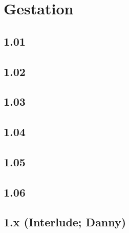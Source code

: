 \part{Gestation}
\chapter{1.01}


\chapter{1.02}


\chapter{1.03}


\chapter{1.04}


\chapter{1.05}


\chapter{1.06}


\chapter{1.x (Interlude; Danny)}

